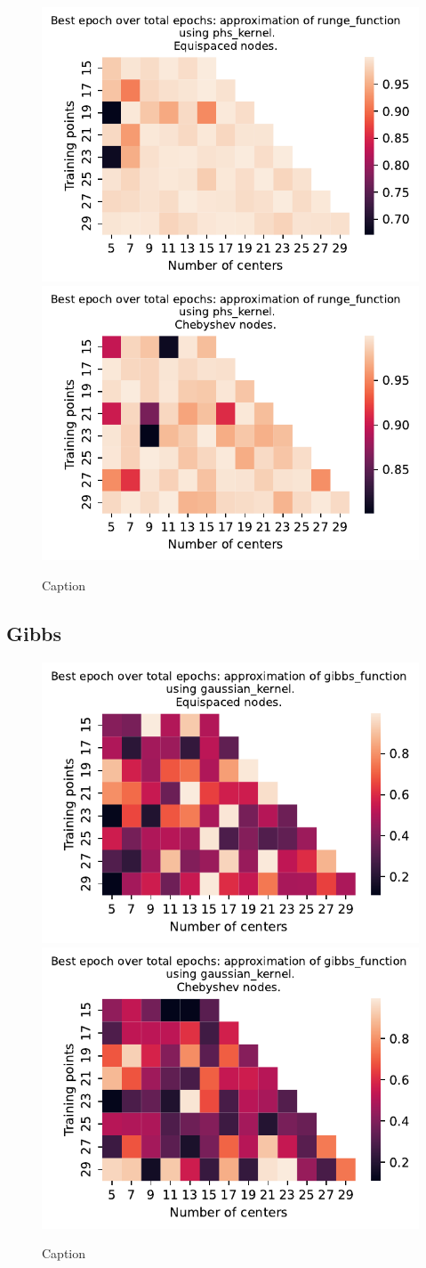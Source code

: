 \documentclass[12pt]{report} %
\begin{document}
\begin{figure}[ht]
  \centering

  \includegraphics[width=.49\textwidth]{imagenes/experiments/1d/variational_epochs/runge_function-Kphs_kernel-Equi-epochs.pdf}
  \includegraphics[width=.49\textwidth]{imagenes/experiments/1d/variational_epochs/runge_function-Kphs_kernel-Cheb-epochs.pdf}
  \caption{Caption}
  \label{fig:epochs-runge-phs}
\end{figure}


\subsection*{Gibbs}

\begin{figure}[ht]
  \centering

  \includegraphics[width=.49\textwidth]{imagenes/experiments/1d/variational_epochs/gibbs_function-Kgaussian_kernel-Equi-epochs.pdf}
  \includegraphics[width=.49\textwidth]{imagenes/experiments/1d/variational_epochs/gibbs_function-Kgaussian_kernel-Cheb-epochs.pdf}
  \caption{Caption}
  \label{fig:epochs-gibbs-gaussian}
\end{figure}
\end{document}
